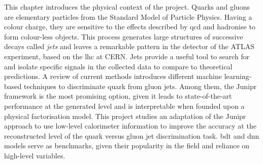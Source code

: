 \begin{tcolorbox}[colback=oxfordblue!5,colframe=blue!40!black,title=Summary of the Chapter]
{This chapter introduces the physical context of the project. Quarks and gluons are elementary particles from the Standard Model of Particle Physics. Having a colour charge, they are sensitive to the effects described by \gls{qcd} and hadronise to form colour-less objects. This process generates large structures of successive decays called \textit{jets} and leaves a remarkable pattern in the detector of the ATLAS experiment, based on the \gls{lhc} at CERN. Jets provide a useful tool to search for and isolate specific signals in the collected data to compare to theoretical predictions. A review of current methods introduces different machine learning-based techniques to discriminate quark from gluon jets. Among them, the Junipr framework is the most promising option, given it leads to state-of-the-art performance at the generated level and is interpretable when founded upon a physical factorisation model. This project studies an adaptation of the Junipr approach to use low-level calorimeter information to improve the accuracy at the reconstructed level of the quark versus gluon jet discrimination task. \gls{bdt} and \gls{dnn} models serve as benchmarks, given their popularity in the field and reliance on high-level variables.}
\end{tcolorbox}
